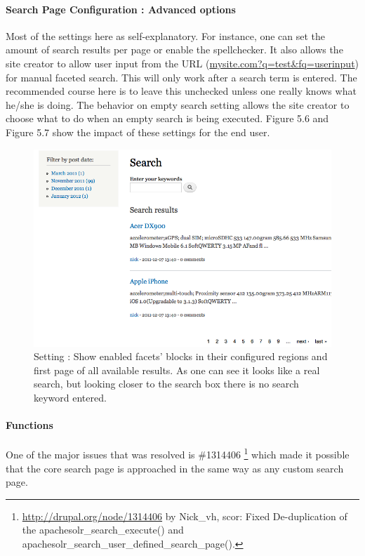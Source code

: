 \paragraph{Search Page Configuration : Advanced options}
Most of the settings here as self-explanatory. For instance, one can set the amount of search results per page or enable the spellchecker. It also allows the site creator to allow user input from the URL (\url{mysite.com?q=test&fq=userinput}) for manual faceted search. This will only work after a search term is entered. The recommended course here is to leave this unchecked unless one really knows what he/she is doing. The behavior on empty search setting allows the site creator to choose what to do when an empty search is being executed. Figure 5.6 and Figure 5.7 show the impact of these settings for the end user. 

\begin{figure}
     \includegraphics[width=\textwidth]{images/implementation/search_first_page_with_blocks_in_region.png}
     \caption{Setting : Show enabled facets' blocks in their configured regions and first page of all available results. As one can see it looks like a real search, but looking closer to the search box there is no search keyword entered.}
\end{figure}

\paragraph{Functions}
One of the major issues that was resolved is \#1314406 \footnote{\url{http://drupal.org/node/1314406} by Nick\_vh, scor: Fixed De-duplication of the apachesolr\_search\_execute() and apachesolr\_search\_user\_defined\_search\_page().} which made it possible that the core search page is approached in the same way as any custom search page.

